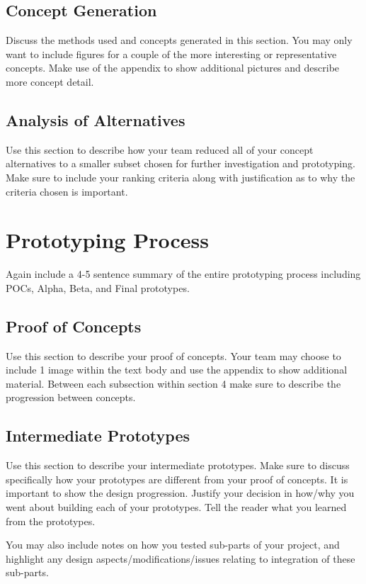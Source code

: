 \documentclass[12pt]{article}
\begin{document}
\subsection{Concept Generation}
Discuss the methods used and concepts generated in this section.  You may only want to include figures for a couple of the more interesting or representative concepts.  Make use of the appendix to show additional pictures and describe more concept detail.  



\subsection{Analysis of Alternatives}
Use this section to describe how your team reduced all of your concept alternatives to a smaller subset chosen for further investigation and prototyping.  Make sure to include your ranking criteria along with justification as to why the criteria chosen is important. 





\section{Prototyping Process}
Again include a 4-5 sentence summary of the entire prototyping process including POCs, Alpha, Beta, and Final prototypes.  


\subsection{Proof of Concepts}
Use this section to describe your proof of concepts.  Your team may choose to include 1 image within the text body and use the appendix to show additional material.  Between each subsection within section 4 make sure to describe the progression between concepts.  


\subsection{Intermediate Prototypes}
Use this section to describe your intermediate prototypes.  Make sure to discuss specifically how your prototypes are different from your proof of concepts.  It is important to show the design progression.  Justify your decision in how/why you went about building each of your prototypes.  Tell the reader what you learned from the prototypes.

You may also include notes on how you tested sub-parts of your project, and highlight any design aspects/modifications/issues relating to integration of these sub-parts.  
\end{document}
